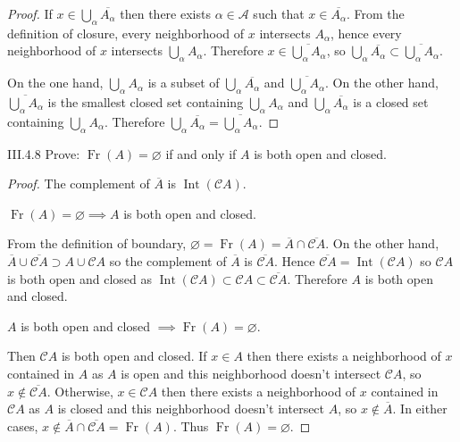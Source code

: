 \begin{proof}
    If \( x \in \bigcup_{\alpha} \overline{A_{\alpha}} \) then there exists \( \alpha \in \mathscr{A} \) such that \( x \in \overline{A_{\alpha}} \). From the definition of closure, every neighborhood of \(x\) intersects \( A_{\alpha} \), hence every neighborhood of \(x\) intersects \( \bigcup_{\alpha} A_{\alpha} \). Therefore \( x \in \overline{\bigcup_{\alpha} A_{\alpha}} \), so \( \bigcup_{\alpha} \overline{A_{\alpha}} \subset \overline{\bigcup_{\alpha} A_{\alpha}} \).

    On the one hand, \( \bigcup_{\alpha} A_{\alpha} \) is a subset of \( \bigcup_{\alpha} \overline{A_{\alpha}} \) and \( \overline{\bigcup_{\alpha} A_{\alpha}} \). On the other hand, \( \overline{\bigcup_{\alpha} A_{\alpha}} \) is the smallest closed set containing \( \bigcup_{\alpha} A_{\alpha} \) and \( \bigcup_{\alpha} \overline{A_{\alpha}} \) is a closed set containing \( \bigcup_{\alpha} A_{\alpha} \). Therefore \( \bigcup_{\alpha} \overline{A_{\alpha}} = \overline{\bigcup_{\alpha} A_{\alpha}} \).
\end{proof}

\begin{problem}{III.4.8}
Prove: \( \operatorname{Fr}(A) = \varnothing \) if and only if \(A\) is both open and closed.
\end{problem}

\begin{proof}
    The complement of \( \overline{A} \) is \( \operatorname{Int}(\mathscr{C}A) \).

    \( \operatorname{Fr}(A) = \varnothing \implies A \) is both open and closed.

    From the definition of boundary, \( \varnothing = \operatorname{Fr}(A) = \overline{A} \cap \overline{\mathscr{C}A} \). On the other hand, \( \overline{A} \cup \overline{\mathscr{C}A} \supset A \cup \mathscr{C}A \) so the complement of \( \overline{A} \) is \( \overline{\mathscr{C}A} \). Hence \( \overline{\mathscr{C}A} = \operatorname{Int}(\mathscr{C}A) \) so \( \mathscr{C}A \) is both open and closed as \( \operatorname{Int}(\mathscr{C}A) \subset \mathscr{C}A \subset \overline{\mathscr{C}A} \). Therefore \(A\) is both open and closed.

    \( A \) is both open and closed \( \implies \operatorname{Fr}(A) = \varnothing \).

    Then \( \mathscr{C}A \) is both open and closed. If \( x \in A \) then there exists a neighborhood of \(x\) contained in \(A\) as \(A\) is open and this neighborhood doesn't intersect \(\mathscr{C}A\), so \( x \notin \overline{\mathscr{C}A} \). Otherwise, \( x \in \mathscr{C}A \) then there exists a neighborhood of \(x\) contained in \(\mathscr{C}A\) as \( A \) is closed and this neighborhood doesn't intersect \(A\), so \( x \notin \overline{A} \). In either cases, \( x \notin \overline{A} \cap \overline{\mathscr{C}A} = \operatorname{Fr}(A) \). Thus \( \operatorname{Fr}(A) = \varnothing \).
\end{proof}

